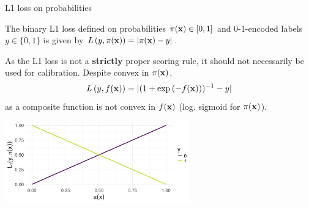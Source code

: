 \documentclass[11pt,compress,t,notes=noshow, xcolor=table]{beamer}
\begin{document}
\begin{vbframe}{L1 loss on probabilities}

The binary L1 loss defined on probabilities $\pi(\mathbf{x}) \in [0, 1]$ and 0-1-encoded labels $y \in \{0, 1\}$ is given by $L\left(y, \pi(\mathbf{x})\right) = |\pi(\mathbf{x}) - y|$.

As the L1 loss is not a \textbf{strictly} proper scoring rule, it should not necessarily be used for calibration. %
Despite convex in $\pi(\mathbf{x})$, $$L\left(y, f(\mathbf{x})\right)=|(1+\exp{(-f(\mathbf{x}))})^{-1}-y|$$ as a composite function is not convex in $f(\mathbf{x})$ (log. sigmoid for $\pi(\mathbf{x})$).
\vspace{-0.2cm}
\begin{center}
\includegraphics[width = 0.6\textwidth]{figure/l1_loss.png}
\end{center}


\end{vbframe}





\endlecture
\end{document}
